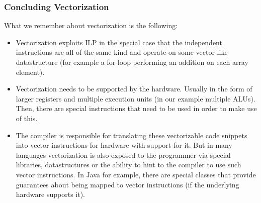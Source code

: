 \documentclass[main.tex]{subfiles}
\begin{document}
\subsubsection{Concluding Vectorization}
What we remember about vectorization is the following:
\begin{itemize}
  \item Vectorization exploits ILP in the special case that the independent instructions are all of the same kind and operate on some vector-like datastructure (for example a for-loop performing an addition on each array element).
  \item Vectorization needs to be supported by the hardware. Usually in the form of larger registers and multiple execution units (in our example multiple ALUs). Then, there are special instructions that need to be used in order to make use of this.
  \item The compiler is responsible for translating these vectorizable code snippets into vector instructions for hardware with support for it. But in many languages vectorization is also exposed to the programmer via special libraries,  datastructures or the ability to hint to the compiler to use such vector instructions. In Java for example, there are special classes that provide guarantees about being mapped to vector instructions (if the underlying hardware supports it).
\end{itemize}
\end{document}
